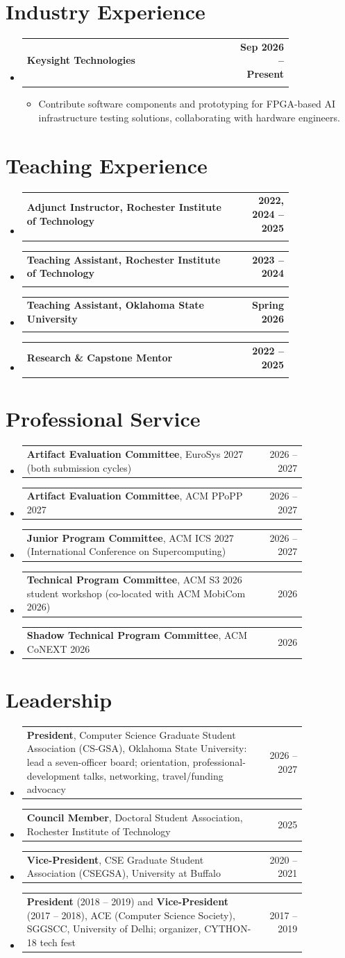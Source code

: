 \documentclass[letterpaper,10pt]{article}
\makeatletter
\newcommand{\cvsection}[2][5]{\Needspace{#1\baselineskip}\section{#2}}
\newcommand{\entry}[4]{%
  \item\begin{tabular*}{\linewidth}{@{}p{0.80\linewidth}@{\extracolsep{\fill}}r@{}}
    \leavevmode\textbf{#1} & \textbf{\small #2}\\
    \leavevmode{\small\itshape\color{muted} #3} & {\small\itshape\color{muted} #4}\\
  \end{tabular*}\vspace{-4pt}}
\newcommand{\entryline}[2]{%
  \item\begin{tabular*}{\linewidth}{@{}p{0.84\linewidth}@{\extracolsep{\fill}}r@{}}
    \leavevmode #1 & \small #2\\
  \end{tabular*}\vspace{-3pt}}
\newenvironment{entries}{\begin{itemize}[leftmargin=0pt,label={},itemsep=2pt,topsep=0pt,parsep=0pt]}{\end{itemize}}
\newenvironment{bullets}{\begin{itemize}[leftmargin=1.15em,label=\textcolor{accent}{\textbullet},itemsep=1pt,topsep=2pt,parsep=0pt]\small}{\end{itemize}\vspace{-1pt}}
\makeatother
\begin{document}
\cvsection[8]{Industry Experience}
\begin{entries}
  \entry{Keysight Technologies}{Sep 2026 -- Present}
        {R\&D Software Engineering Intern (FPGA development for AI infrastructure testing solutions) \,\textperiodcentered\, part-time, remote}{}
  \begin{bullets}
    \item Contribute software components and prototyping for FPGA-based AI infrastructure testing solutions, collaborating with
          hardware engineers.
  \end{bullets}
\end{entries}

\cvsection[7]{Teaching Experience}
\begin{entries}
  \entry{Adjunct Instructor, Rochester Institute of Technology}{2022, 2024 -- 2025}
        {CSEC-140 Intro to Cybersecurity (2022, 2025) \,\textperiodcentered\, CSCI-455 Principles of Cybersecurity (2024, 2025) \,\textperiodcentered\, GCIS-123 Software Dev.\ \& Problem Solving I (2025)}{}
  \entry{Teaching Assistant, Rochester Institute of Technology}{2023 -- 2024}
        {CSCI-243 Mechanics of Programming \,\textperiodcentered\, CSEC-759 Advanced Networking \& Distributed Systems Security (graduate seminar)}{}
  \entry{Teaching Assistant, Oklahoma State University}{Spring 2026}
        {Distributed and Cloud Computing}{}
  \entry{Research \& Capstone Mentor}{2022 -- 2025}
        {Mentored three master's students and two undergraduate students on research and capstone projects}{}
\end{entries}

\cvsection[7]{Professional Service}
\begin{entries}
  \entryline{\textbf{Artifact Evaluation Committee}, EuroSys 2027 (both submission cycles)}{2026 -- 2027}
  \entryline{\textbf{Artifact Evaluation Committee}, ACM PPoPP 2027}{2026 -- 2027}
  \entryline{\textbf{Junior Program Committee}, ACM ICS 2027 (International Conference on Supercomputing)}{2026 -- 2027}
  \entryline{\textbf{Technical Program Committee}, ACM S3 2026 student workshop (co-located with ACM MobiCom 2026)}{2026}
  \entryline{\textbf{Shadow Technical Program Committee}, ACM CoNEXT 2026}{2026}
\end{entries}

\cvsection[6]{Leadership}
\begin{entries}
  \entryline{\textbf{President}, Computer Science Graduate Student Association (CS-GSA), Oklahoma State University: lead a
    seven-officer board; orientation, professional-development talks, networking, travel/funding advocacy}{2026 -- 2027}
  \entryline{\textbf{Council Member}, Doctoral Student Association, Rochester Institute of Technology}{2025}
  \entryline{\textbf{Vice-President}, CSE Graduate Student Association (CSEGSA), University at Buffalo}{2020 -- 2021}
  \entryline{\textbf{President} (2018 -- 2019) and \textbf{Vice-President} (2017 -- 2018), ACE (Computer Science Society), SGGSCC, University of Delhi; organizer, CYTHON-18 tech fest}{2017 -- 2019}
\end{entries}
\end{document}

